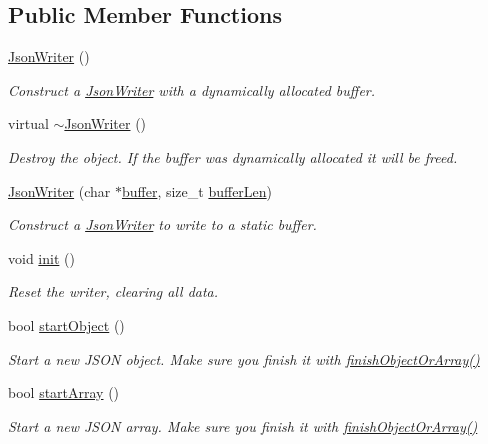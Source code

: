 \subsection*{Public Member Functions}
\begin{DoxyCompactItemize}
\item 
\hyperlink{class_json_writer_ac236bb60b9ae908fd178baff276df0c8}{Json\+Writer} ()
\begin{DoxyCompactList}\small\item\em Construct a \hyperlink{class_json_writer}{Json\+Writer} with a dynamically allocated buffer. \end{DoxyCompactList}\item 
virtual \hyperlink{class_json_writer_ac6555dd3dfadc937848046a58bd5f974}{$\sim$\+Json\+Writer} ()
\begin{DoxyCompactList}\small\item\em Destroy the object. If the buffer was dynamically allocated it will be freed. \end{DoxyCompactList}\item 
\hyperlink{class_json_writer_ae97b42591255aece772a046eb098fd77}{Json\+Writer} (char $\ast$\hyperlink{class_json_buffer_aaee27fe51d12d68bd6031df3bc78b6b5}{buffer}, size\+\_\+t \hyperlink{class_json_buffer_af06130f43f71623ea6afe049c846e52b}{buffer\+Len})
\begin{DoxyCompactList}\small\item\em Construct a \hyperlink{class_json_writer}{Json\+Writer} to write to a static buffer. \end{DoxyCompactList}\item 
void \hyperlink{class_json_writer_ad7dea044e659a5e1d368ff4628e9eea6}{init} ()
\begin{DoxyCompactList}\small\item\em Reset the writer, clearing all data. \end{DoxyCompactList}\item 
bool \hyperlink{class_json_writer_a43d1a78bf211a2f12cfe9253462717ae}{start\+Object} ()
\begin{DoxyCompactList}\small\item\em Start a new J\+S\+ON object. Make sure you finish it with \hyperlink{class_json_writer_adbd96b46b0679bea3a066c0e62bd86b0}{finish\+Object\+Or\+Array()} \end{DoxyCompactList}\item 
bool \hyperlink{class_json_writer_a7ccfcbf66a8ed9a2728e6f6ae4b705ec}{start\+Array} ()
\begin{DoxyCompactList}\small\item\em Start a new J\+S\+ON array. Make sure you finish it with \hyperlink{class_json_writer_adbd96b46b0679bea3a066c0e62bd86b0}{finish\+Object\+Or\+Array()} \end{DoxyCompactList}\item 

\end{DoxyCompactItemize}
